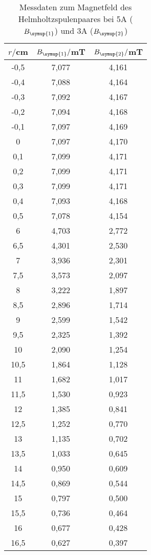 \begin{table}
  \centering
  \caption{Messdaten zum Magnetfeld des Helmholtzspulenpaares bei 5A ($B_{\symup{1}}$)
  und 3A ($B_{\symup{2}}$)}
  \label{tab:helmholtz}
  \begin{tabular}{c c c}
    \toprule
    $r/$cm & $B_{\symup{1}}/$mT & $B_{\symup{2}}/$mT\\
    \midrule
    -0,5	&  7,077 & 4,161\\
    -0,4	&  7,088 & 4,164\\
    -0,3	&  7,092 & 4,167\\
    -0,2	&  7,094 & 4,168\\
    -0,1	&  7,097 & 4,169\\
    0	    &  7,097 & 4,170\\
    0,1	  &  7,099 & 4,171\\
    0,2	  &  7,099 & 4,171\\
    0,3	  &  7,099 & 4,171\\
    0,4	  &  7,093 & 4,168\\
    0,5	  &  7,078 & 4,154\\
    6	    &  4,703 & 2,772\\
    6,5	  &  4,301 & 2,530\\
    7	    &  3,936 & 2,301\\
    7,5	  &  3,573 & 2,097\\
    8	    &  3,222 & 1,897\\
    8,5	  &  2,896 & 1,714\\
    9	    &  2,599 & 1,542\\
    9,5 	&  2,325 & 1,392\\
    10	  &  2,090 & 1,254\\
    10,5	&  1,864 & 1,128\\
    11	  &  1,682 & 1,017\\
    11,5	&  1,530 & 0,923\\
    12	  &  1,385 & 0,841\\
    12,5	&  1,252 & 0,770\\
    13	  &  1,135 & 0,702\\
    13,5	&  1,033 & 0,645\\
    14	  &  0,950 & 0,609\\
    14,5	&  0,869 & 0,544\\
    15	  &  0,797 & 0,500\\
    15,5	&  0,736 & 0,464\\
    16	  &  0,677 & 0,428\\
    16,5	&  0,627 & 0,397\\

\end{tabular}
\end{table}
